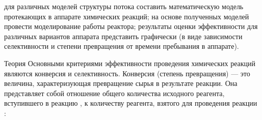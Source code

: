 
\goal для различных моделей структуры потока составить математическую модель протекающих в аппарате химических реакций; на основе полученных моделей провести моделирование работы реактора; результаты оценки эффективности для различных вариантов аппарата представить графически (в виде зависимости селективности и степени превращения от времени пребывания в аппарате).

Теория
Основными критериями эффективности проведения химических реакций являются конверсия и селективность. 
Конверсия (степень превращения) --- это величина, характеризующая превращение сырья в результате реакции. Она представляет собой отношение общего количества исходного реагента, вступившего в реакцию , к количеству реагента, взятого для проведения реакции :